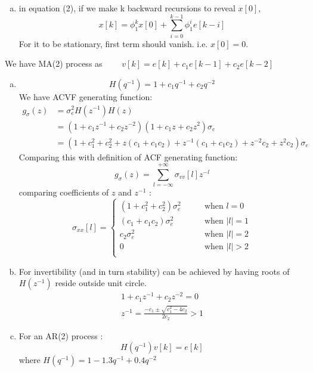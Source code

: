 \documentclass[11pt,paper=a4,answers]{exam}
\begin{document}
\begin{questions}
\begin{enumerate}[(a)]
\item in equation (2), if we make k backward recursions to reveal $x[0]$, \\
$$
x[k] = \phi_1 ^k x[0] + \sum_{i=0}^{k-1} \phi_1 ^i e[k-i]
$$
For it to be stationary, first term should vanish. i.e. $x[0] = 0$.
\end{enumerate}
\question
We have MA(2) process as $\qquad v[k] = e[k] + c_1 e[k-1] + c_2 e[k-2]$
\begin{enumerate}[(a)]
    \item 
    $$
    H(q^{-1}) = 1 + c_1 q^{-1} + c_2 q^{-2}
    $$
    We have ACVF generating function:\\
    \begin{align}
        g_\sigma(z) &= \sigma_e ^2 H(z^{-1}) H(z) \nonumber \\
        &= (1 + c_1 z^{-1} + c_2 z^{-2}) (1 + c_1 z + c_2 z^2) \sigma_e \nonumber \\
        &= (1 + c_1 ^2 + c_2 ^2 + z(c_1 + c_1 c_2) + z^{-1} (c_1 + c_1 c_2) + z^{-2} c_2 + z^2 c_2) \sigma_e \nonumber
    \end{align}
    Comparing this with definition of ACF generating function:
    $$
    g_\sigma (z) = \sum_{l=-\infty}^{+\infty} \sigma_{vv}[l] z^{-l}
    $$
    comparing coefficients of $z$ and $z^{-1}$ :\\
    $$
    \sigma_{xx}[l] = \begin{cases}
        (1 + c_1 ^2 + c_2 ^2)\sigma_e ^2  & \qquad \text{when $l = 0$}\\
        (c_1 + c_1 c_2) \sigma_e ^2  & \qquad \text{when $|l| = 1$}\\
        c_2 \sigma_e ^2  & \qquad \text{when $|l| = 2$}\\
        0  & \qquad \text{when $|l| > 2$}\\
        \end{cases}
    $$
    \item For invertibility (and in turn stability) can be achieved by having roots of $H(z^{-1})$ reside outside unit circle.\\
    \begin{align}
        1 + c_1 z^{-1} + c_2 z^{-2} = 0 \nonumber\\
        z^{-1} = \frac{-c_1 \pm \sqrt{c_1^2 - 4c_2}}{2 c_2} > 1  \nonumber
    \end{align}
    \item
    For an AR(2) process :$$ H(q^{-1})v[k] = e[k]$$
    where $H(q^{-1}) = 1 - 1.3q^{-1} + 0.4q^{-2}$\\

\end{enumerate}
\end{questions}
\end{document}
